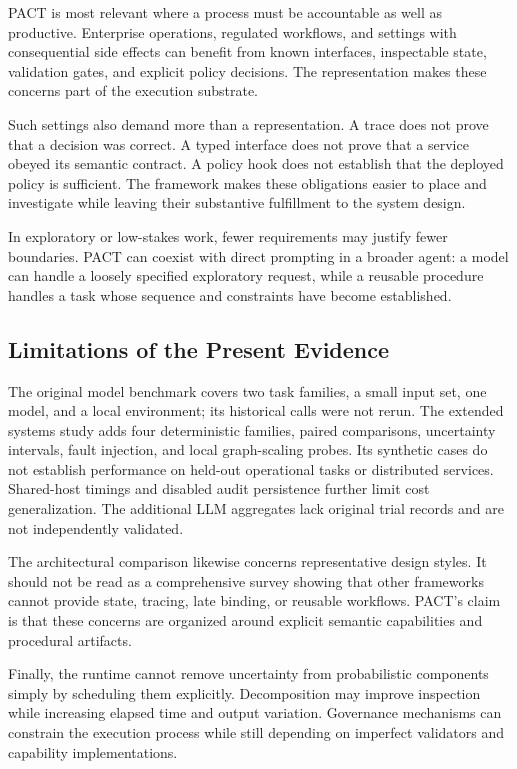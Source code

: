 \documentclass[10pt,twocolumn,a4paper]{article}
\begin{document}
PACT is most relevant where a process must be accountable as well as productive. Enterprise operations, regulated workflows, and settings with consequential side effects can benefit from known interfaces, inspectable state, validation gates, and explicit policy decisions. The representation makes these concerns part of the execution substrate.


Such settings also demand more than a representation. A trace does not prove that a decision was correct. A typed interface does not prove that a service obeyed its semantic contract. A policy hook does not establish that the deployed policy is sufficient. The framework makes these obligations easier to place and investigate while leaving their substantive fulfillment to the system design.


In exploratory or low-stakes work, fewer requirements may justify fewer boundaries. PACT can coexist with direct prompting in a broader agent: a model can handle a loosely specified exploratory request, while a reusable procedure handles a task whose sequence and constraints have become established.


\subsection{Limitations of the Present Evidence}

The original model benchmark covers two task families, a small input set, one model, and a local environment; its historical calls were not rerun. The extended systems study adds four deterministic families, paired comparisons, uncertainty intervals, fault injection, and local graph-scaling probes. Its synthetic cases do not establish performance on held-out operational tasks or distributed services. Shared-host timings and disabled audit persistence further limit cost generalization. The additional LLM aggregates lack original trial records and are not independently validated.


The architectural comparison likewise concerns representative design styles. It should not be read as a comprehensive survey showing that other frameworks cannot provide state, tracing, late binding, or reusable workflows. PACT's claim is that these concerns are organized around explicit semantic capabilities and procedural artifacts.


Finally, the runtime cannot remove uncertainty from probabilistic components simply by scheduling them explicitly. Decomposition may improve inspection while increasing elapsed time and output variation. Governance mechanisms can constrain the execution process while still depending on imperfect validators and capability implementations.
\end{document}

